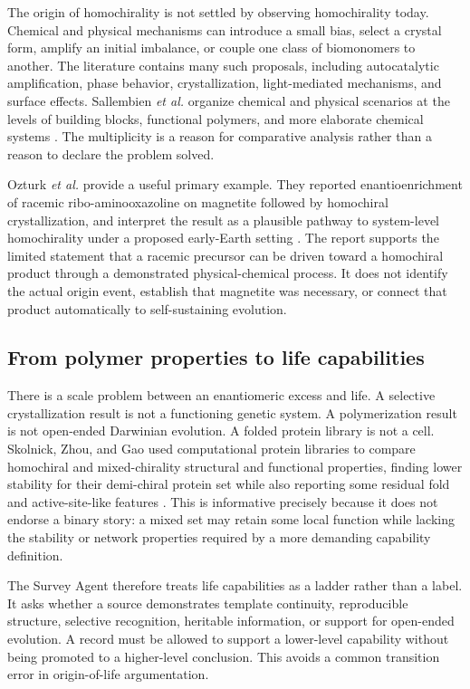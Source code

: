 \documentclass[conference]{IEEEtran}
\begin{document}
The origin of homochirality is not settled by observing homochirality today. Chemical and physical mechanisms can introduce a small bias, select a crystal form, amplify an initial imbalance, or couple one class of biomonomers to another. The literature contains many such proposals, including autocatalytic amplification, phase behavior, crystallization, light-mediated mechanisms, and surface effects. Sallembien \textit{et al.} organize chemical and physical scenarios at the levels of building blocks, functional polymers, and more elaborate chemical systems \cite{sallembien}. The multiplicity is a reason for comparative analysis rather than a reason to declare the problem solved.

Ozturk \textit{et al.} provide a useful primary example. They reported enantioenrichment of racemic ribo-aminooxazoline on magnetite followed by homochiral crystallization, and interpret the result as a plausible pathway to system-level homochirality under a proposed early-Earth setting \cite{ozturk}. The report supports the limited statement that a racemic precursor can be driven toward a homochiral product through a demonstrated physical-chemical process. It does not identify the actual origin event, establish that magnetite was necessary, or connect that product automatically to self-sustaining evolution.

\subsection{From polymer properties to life capabilities}

There is a scale problem between an enantiomeric excess and life. A selective crystallization result is not a functioning genetic system. A polymerization result is not open-ended Darwinian evolution. A folded protein library is not a cell. Skolnick, Zhou, and Gao used computational protein libraries to compare homochiral and mixed-chirality structural and functional properties, finding lower stability for their demi-chiral protein set while also reporting some residual fold and active-site-like features \cite{skolnick}. This is informative precisely because it does not endorse a binary story: a mixed set may retain some local function while lacking the stability or network properties required by a more demanding capability definition.

The Survey Agent therefore treats life capabilities as a ladder rather than a label. It asks whether a source demonstrates template continuity, reproducible structure, selective recognition, heritable information, or support for open-ended evolution. A record must be allowed to support a lower-level capability without being promoted to a higher-level conclusion. This avoids a common transition error in origin-of-life argumentation.
\end{document}
